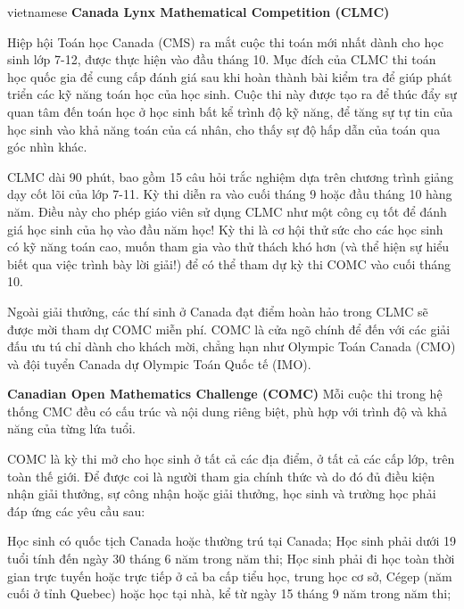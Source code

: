 \documentclass{article}
\begin{document}
\begin{otherlanguage*}{vietnamese}
\bigbreak
\textbf{Canada Lynx Mathematical Competition (CLMC)}

Hiệp hội Toán học Canada (CMS) ra mắt cuộc thi toán mới nhất dành cho học sinh lớp 7-12, được thực hiện vào đầu tháng 10.
Mục đích của CLMC thi toán học quốc gia để cung cấp đánh giá sau khi hoàn thành bài kiểm tra để giúp phát triển các kỹ năng toán học của học sinh.
Cuộc thi này được tạo ra để thúc đẩy sự quan tâm đến toán học ở học sinh bất kể trình độ kỹ năng,
để tăng sự tự tin của học sinh vào khả năng toán của cá nhân, cho thấy sự độ hấp dẫn của toán qua góc nhìn khác.

CLMC dài 90 phút, bao gồm 15 câu hỏi trắc nghiệm dựa trên chương trình giảng dạy cốt lõi của lớp 7-11.
Kỳ thi diễn ra vào cuối tháng 9 hoặc đầu tháng 10 hàng năm. Điều này cho phép giáo viên sử dụng CLMC như một công cụ tốt để đánh giá học sinh của họ vào đầu năm học! 
Kỳ thi là cơ hội thử sức cho các học sinh có kỹ năng toán cao, muốn tham gia vào thử thách khó hơn (và thể hiện sự hiểu biết qua việc trình bày lời giải!) để có thể tham dự kỳ thi COMC vào cuối tháng 10.

Ngoài giải thưởng, các thí sinh ở Canada đạt điểm hoàn hảo trong CLMC sẽ được mời tham dự COMC miễn phí.
COMC là cửa ngõ chính để đến với các giải đấu ưu tú chỉ dành cho khách mời, chẳng hạn như Olympic Toán Canada (CMO) và đội tuyển Canada dự Olympic Toán Quốc tế (IMO).

\newpage
\textbf{Canadian Open Mathematics Challenge (COMC)}
Mỗi cuộc thi trong hệ thống CMC đều có cấu trúc và nội dung riêng biệt, phù hợp với trình độ và khả năng của từng lứa tuổi.

COMC là kỳ thi mở cho học sinh ở tất cả các địa điểm, ở tất cả các cấp lớp, trên toàn thế giới.
Để được coi là người tham gia chính thức và do đó đủ điều kiện nhận giải thưởng, sự công nhận hoặc giải thưởng, học sinh và trường học phải đáp ứng các yêu cầu sau:
\begin{itemize}[topsep=0pt, partopsep=0pt, itemsep=0pt]
    \ii Học sinh có quốc tịch Canada hoặc thường trú tại Canada;
    \ii Học sinh phải dưới 19 tuổi tính đến ngày 30 tháng 6 năm trong năm thi;
    \ii Học sinh phải đi học toàn thời gian trực tuyến hoặc trực tiếp ở cả ba cấp tiểu học, trung học cơ sở, Cégep (năm cuối ở tỉnh Quebec) hoặc học tại nhà, kể từ ngày 15 tháng 9 năm trong năm thi;
\end{itemize}


\end{otherlanguage*}
\end{document}
